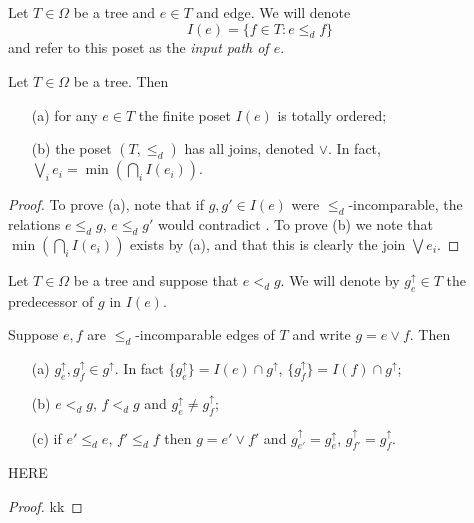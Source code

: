 \documentclass[a4paper,10pt]{article}%
\begin{document}
\begin{notation}\label{INPUTPATH NOT}
	Let $T \in \Omega$ be a tree and $e \in T$ and edge. We will denote
	\[ I(e) =\{f \in T \colon e \leq_d f \} \]
and refer to this poset as the \textit{input path of $e$}.
\end{notation}


\begin{proposition}\label{INPUTPATHS PROP}
	Let $T \in \Omega$ be a tree. Then
	\begin{itemize}
		\item[(a)] for any $e \in T$ the finite poset $I(e)$ is totally ordered;
		\item[(b)] the poset $(T,\leq_d)$ has all joins, denoted $\vee$. In fact, $\bigvee_{i} e_i = \min (\bigcap_{i} I(e_i))$.
	\end{itemize}
\end{proposition}

\begin{proof}
	To prove (a), note that if $g,g' \in I(e)$ were $\leq_d$-incomparable, the relations $e \leq_d g$, $e \leq_d g'$ would contradict \cite[Cor. 5.26]{Pe16b}.
To prove (b) we note that 
	$\min (\bigcap_{i} I(e_i))$ exists by (a), and that this is clearly the join $\bigvee{e_i}$.
\end{proof}


\begin{notation}
	Let $T \in \Omega$ be a tree and suppose that $e <_d g$. We will denote by $g^{\uparrow}_e \in T$ the predecessor of $g$ in $I(e)$.
\end{notation}


\begin{proposition}
Suppose $e,f$ are $\leq_d$-incomparable edges of $T$ and write $g= e \vee f$. Then
\begin{itemize}
\item [(a)] $g^{\uparrow}_e, g^{\uparrow}_f \in g^{\uparrow}$. In fact $\{g^{\uparrow}_e\} = I(e) \cap g^{\uparrow}$,
$\{g^{\uparrow}_f\} = I(f) \cap g^{\uparrow}$;
\item [(b)] $e <_d g$, $f<_d g$ and $g^{\uparrow}_e \neq g^{\uparrow}_f$;
\item[(c)] if $e' \leq_d e$, $f' \leq_d f$ then 
$g=e' \vee f'$ and $g^{\uparrow}_{e'} = g^{\uparrow}_{e}$, $g^{\uparrow}_{f'} = g^{\uparrow}_{f}$.
\end{itemize}
\end{proposition}

{\color{blue} HERE}

\begin{proof}
kk
\end{proof}
\end{document}
